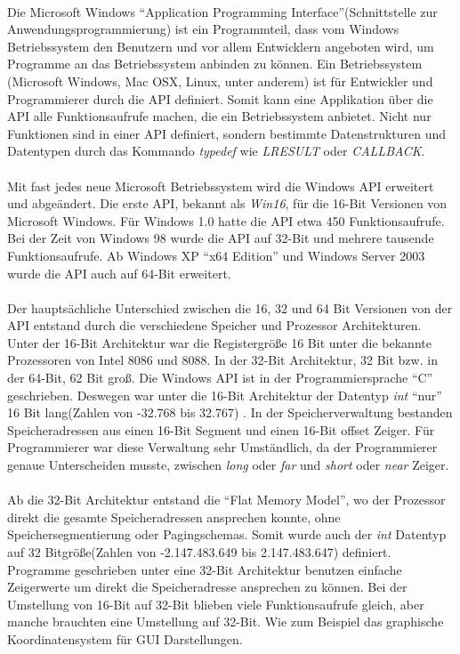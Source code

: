 \paragraph{}
Die Microsoft Windows "`Application Programming Interface"'(Schnittstelle zur Anwendungsprogrammierung) ist ein Programmteil, dass vom Windows Betriebssystem den Benutzern und vor allem Entwicklern angeboten wird, um Programme an das Betriebssystem anbinden zu können. Ein Betriebssystem (Microsoft Windows, Mac OSX, Linux, unter anderem) ist für Entwickler und Programmierer durch die API definiert. Somit kann eine Applikation über die API alle Funktionsaufrufe machen, die ein Betriebssystem anbietet. Nicht nur Funktionen sind in einer API definiert, sondern bestimmte Datenstrukturen und Datentypen durch das Kommando \textit{typedef} wie \textit{LRESULT} oder \textit{CALLBACK}.
\paragraph{}
Mit fast jedes neue Microsoft Betriebssystem wird die Windows API erweitert und abgeändert. Die erste API, bekannt als \textit{Win16}, für die 16-Bit Versionen von Microsoft Windows. Für Windows 1.0 hatte die API etwa 450 Funktionsaufrufe. Bei der Zeit von Windows 98 wurde die API auf 32-Bit und mehrere tausende Funktionsaufrufe. Ab Windows XP "`x64 Edition"' und Windows Server 2003 wurde die API auch auf 64-Bit erweitert.
\paragraph{}
Der hauptsächliche Unterschied zwischen die 16, 32 und 64 Bit Versionen von der API entstand durch die verschiedene Speicher und Prozessor Architekturen. Unter der 16-Bit Architektur war die Registergröße 16 Bit unter die bekannte Prozessoren von Intel 8086 und 8088. In der 32-Bit Architektur, 32 Bit bzw. in der 64-Bit, 62 Bit groß. Die Windows API ist in der Programmiersprache "`C"' geschrieben. Deswegen war unter die 16-Bit Architektur der Datentyp \textit{int} "`nur"' 16 Bit lang(Zahlen von -32.768 bis 32.767) . In der Speicherverwaltung bestanden Speicheradressen aus einen 16-Bit Segment und einen 16-Bit offset Zeiger. Für Programmierer war diese Verwaltung sehr Umständlich, da der Programmierer genaue Unterscheiden musste, zwischen \textit{long} oder \textit{far} und \textit{short} oder \textit{near} Zeiger. 
\paragraph{}
Ab die 32-Bit Architektur entstand die "`Flat Memory Model"', wo der Prozessor direkt die gesamte Speicheradressen ansprechen konnte, ohne Speichersegmentierung oder Pagingschemas. Somit wurde auch der \textit{int} Datentyp auf 32 Bitgröße(Zahlen von -2.147.483.649 bis 2.147.483.647) definiert. Programme geschrieben unter eine 32-Bit Architektur benutzen einfache Zeigerwerte um direkt die Speicheradresse ansprechen zu können. Bei der Umstellung von 16-Bit auf 32-Bit blieben viele Funktionsaufrufe gleich, aber manche brauchten eine Umstellung auf 32-Bit. Wie zum Beispiel das graphische Koordinatensystem für GUI Darstellungen.

